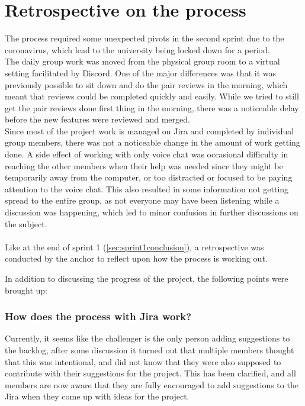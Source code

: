 \section{Retrospective on the process}
The process required some unexpected pivots in the second sprint due to the coronavirus, which lead to the university being locked down for a period.
\\
The daily group work was moved from the physical group room to a virtual setting facilitated by Discord.
One of the major differences was that it was previously possible to sit down and do the pair reviews in the morning, which meant that reviews could be completed quickly and easily.
While we tried to still get the pair reviews done first thing in the morning, there was a noticeable delay before the new features were reviewed and merged.\\
Since most of the project work is managed on Jira and completed by individual group members, there was not a noticeable change in the amount of work getting done.
A side effect of working with only voice chat was occasional difficulty in reaching the other members when their help was needed since they might be temporarily away from the computer, or too distracted or focused to be paying attention to the voice chat.
This also resulted in some information not getting spread to the entire group, as not everyone may have been listening while a discussion was happening, which led to minor confusion in further discussions on the subject.\\\\

Like at the end of sprint 1 (\autoref{sec:sprint1conclusion}), a retrospective was conducted by the anchor to reflect upon how the process is working out.

In addition to discussing the progress of the project, the following points were brought up:

\subsubsection{How does the process with Jira work?}
Currently, it seems like the challenger is the only person adding suggestions to the backlog, after some discussion it turned out that multiple members thought that this was intentional, and did not know that they were also supposed to contribute with their suggestions for the project.
This has been clarified, and all members are now aware that they are fully encouraged to add suggestions to the Jira when they come up with ideas for the project.

